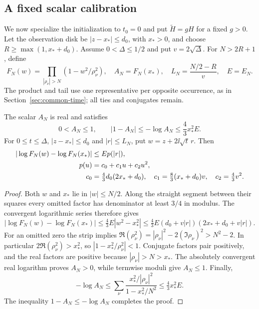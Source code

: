 \subsection{A fixed scalar calibration}

We now specialize the initialization to $t_0=0$ and put
$\widetilde H=gH$ for a fixed $g>0$. Let the observation disk be
$|z-x_*|\le d_0$, with $x_*>0$, and choose
$R\ge\max(1,x_*+d_0)$. Assume $0<\Delta\le1/2$ and put
$v=2\sqrt{\Delta}$. For $N>2R+1$, define
\begin{equation}
 F_N(w)=\prod_{|\rho_\nu|>N}(1-w^2/\rho_\nu^2),\quad
 A_N=F_N(x_*),\quad
 L_N=\frac{N/2-R}{v},\quad E=E_N.
 \label{cond:calibration}
\end{equation}
The product and tail use one representative per opposite occurrence,
as in Section~\ref{sec:common-time}; all ties and conjugates remain.

\begin{lemma}\label{cond:ratio}
The scalar $A_N$ is real and satisfies
\begin{equation}
 0<A_N\le1,\qquad
 |1-A_N|\le-\log A_N\le\frac43x_*^2E.
 \label{cond:scalar}
\end{equation}
For $0\le t\le\Delta$, $|z-x_*|\le d_0$ and $|r|\le L_N$,
put $w=z+2\ii\sqrt t\,r$. Then
\begin{align}
 |\log F_N(w)-\log F_N(x_*)|&\le E p(|r|),\notag\\
 p(u)&=c_0+c_1u+c_2u^2,\notag\\
 c_0&=\tfrac43d_0(2x_*+d_0),\quad
 c_1=\tfrac83(x_*+d_0)v,\quad c_2=\tfrac43v^2.
 \label{cond:local-ratio}
\end{align}
\end{lemma}

\begin{proof}
Both $w$ and $x_*$ lie in $|w|\le N/2$. Along the straight segment
between their squares every omitted factor has denominator at least
$3/4$ in modulus. The convergent logarithmic series therefore gives
\[
 |\log F_N(w)-\log F_N(x_*)|
 \le \tfrac43E|w^2-x_*^2|
 \le\tfrac43E(d_0+v|r|)(2x_*+d_0+v|r|).
\]
For an omitted zero the strip implies
$\Re(\rho_\nu^2)=|\rho_\nu|^2-2(\Im\rho_\nu)^2>N^2-2$.
In particular $2\Re(\rho_\nu^2)>x_*^2$, so
$|1-x_*^2/\rho_\nu^2|<1$. Conjugate factors pair positively, and
the real factors are positive because $|\rho_\nu|>N>x_*$.
The absolutely convergent real logarithm proves $A_N>0$, while
termwise moduli give $A_N\le1$. Finally,
\[
 -\log A_N\le\sum_\nu
       \frac{x_*^2/|\rho_\nu|^2}{1-x_*^2/N^2}
       \le\tfrac43x_*^2E .
\]
The inequality $1-A_N\le-\log A_N$ completes the proof.
\end{proof}

